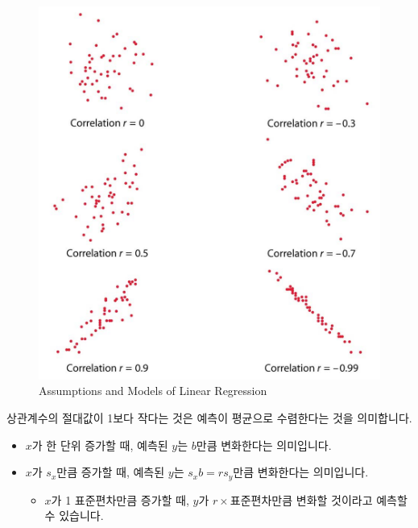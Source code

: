 \documentclass[]{book}
\providecommand{\tightlist}{%
  \setlength{\itemsep}{0pt}\setlength{\parskip}{0pt}}
\begin{document}
\begin{figure}

{\centering \includegraphics[width=6.12in]{./Chapters_pdfR/plot/correlation} 

}

\caption{Assumptions and Models of Linear Regression}\label{fig:unnamed-chunk-218}
\end{figure}

상관계수의 절대값이 1보다 작다는 것은 예측이 평균으로 수렴한다는 것을 의미합니다.

\begin{itemize}
\tightlist
\item
  \(x\)가 한 단위 증가할 때, 예측된 \(y\)는 \(b\)만큼 변화한다는 의미입니다.
\item
  \(x\)가 \(s_x\)만큼 증가할 때, 예측된 \(y\)는 \(s_xb = rs_y\)만큼 변화한다는 의미입니다.

  \begin{itemize}
  \tightlist
  \item
    \(x\)가 1 표준편차만큼 증가할 때, \(y\)가 \(r\times\)표준편차만큼 변화할 것이라고 예측할 수 있습니다.
  \end{itemize}
\end{itemize}
\end{document}
